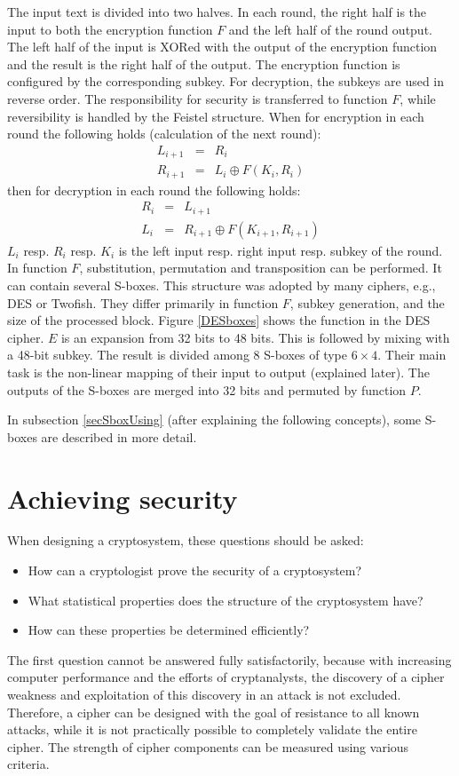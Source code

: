 The input text is divided into two halves. In each round, the right half is the input to both the encryption
function $F$ and the left half of the round output. The left half of the input is XORed with the output of the encryption
function and the result is the right half of the output. The encryption function is configured by the corresponding
subkey. For decryption, the subkeys are used in reverse order.
The responsibility for security is transferred to function $F$, while reversibility
is handled by the Feistel structure.
When for encryption in each round the following holds (calculation of the next round):
\begin{eqnarray}
L_{i+1} & = & R_i \\
R_{i+1} & = & L_i \oplus F(K_i, R_i)
\end{eqnarray}
then for decryption in each round the following holds:
\begin{eqnarray}
R_i & = & L_{i+1} \\
L_i & = & R_{i+1} \oplus F(K_{i+1}, R_{i+1})
\end{eqnarray}
$L_i$ resp. $R_i$ resp. $K_i$ is the left input resp. right input resp. subkey of the round.
In function $F$, substitution, permutation and transposition can be performed. It can contain several S-boxes.
This structure was adopted by many ciphers, e.g., DES or Twofish. They differ primarily in function $F$,
subkey generation, and the size of the processed block. Figure \ref{DESboxes} shows
the function in the DES cipher. $E$ is an expansion from 32 bits to 48 bits. This is followed by mixing with a 48-bit subkey.
The result is divided among 8 S-boxes of type $6 \times 4$. Their main task is
the non-linear mapping of their input to output (explained later). The outputs of the S-boxes are merged into 32 bits and
permuted by function $P$.

In subsection \ref{secSboxUsing} (after explaining the following concepts), some S-boxes
are described in more detail.

\section{Achieving security}
When designing a cryptosystem, these questions should be asked:
\begin{itemize}
  \item How can a cryptologist prove the security of a cryptosystem?
  \item What statistical properties does the structure of the cryptosystem have?
  \item How can these properties be determined efficiently?
\end{itemize}
The first question cannot be answered fully satisfactorily, because with increasing computer performance
and the efforts of cryptanalysts, the discovery of a cipher weakness and exploitation of this discovery
in an attack is not excluded. Therefore, a cipher can be designed with the goal of resistance to all known attacks, while
it is not practically possible to completely validate the entire cipher. The strength of cipher components can be measured using
various criteria.

